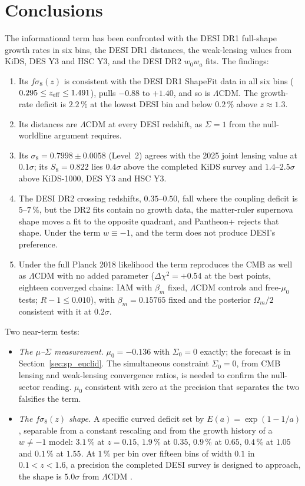 \section{Conclusions}
The informational term has been confronted with the DESI DR1 full-shape growth rates in six bins, the DESI DR1 distances, the weak-lensing values
from KiDS, DES Y3 and HSC Y3, and the DESI DR2 $w_0w_a$ fits. The findings:
\begin{enumerate}
\item Its $f\sigma_8(z)$ is consistent with the DESI DR1 ShapeFit data in all six bins ($0.295\le z_{\rm eff}\le1.491$), pulls $-0.88$ to $+1.40$, and so
is $\Lambda$CDM. The growth-rate deficit is $2.2\,\%$ at the lowest DESI bin and below $0.2\,\%$ above $z\approx1.3$. \calc
\item Its distances are $\Lambda$CDM at every DESI redshift, as $\Sigma=1$ from the null-worldline argument requires. \prediction
\item Its $\sigma_8=0.7998\pm0.0058$ (Level~2) agrees with the 2025 joint lensing value at $0.1\sigma$; its $S_8=0.822$ lies $0.4\sigma$ above the
completed KiDS survey and $1.4$--$2.5\sigma$ above KiDS-1000, DES Y3 and HSC Y3. \calc
\item The DESI DR2 crossing redshifts, $0.35$--$0.50$, fall where the coupling deficit is $5$--$7\,\%$, but the DR2 fits contain no growth data, the
matter-ruler supernova shape moves a fit to the opposite quadrant, and Pantheon+ rejects that shape. Under the term $w\equiv-1$, and the term does not
produce DESI's preference. \calc
\item Under the full Planck 2018 likelihood the term reproduces the CMB as well as $\Lambda$CDM with no added parameter ($\Delta\chi^2=+0.54$ at the best points,
eighteen converged chains: IAM with $\beta_m$ fixed, $\Lambda$CDM controls and free-$\mu_0$ tests; $R-1\le0.010$), with $\beta_m=0.15765$ fixed and the posterior $\Omega_m/2$ consistent with it at $0.2\sigma$. \measured
\end{enumerate}
Two near-term tests:
\begin{itemize}
\item \emph{The $\mu$--$\Sigma$ measurement.} $\mu_0=-0.136$ with $\Sigma_0=0$ exactly; the forecast is in Section~\ref{sec:sp_euclid}. The
simultaneous constraint $\Sigma_0=0$, from CMB lensing and weak-lensing convergence ratios, is needed to confirm the null-sector reading. $\mu_0$
consistent with zero at the precision that separates the two falsifies the term. \prediction
\item \emph{The $f\sigma_8(z)$ shape.} A specific curved deficit set by $E(a)=\exp(1-1/a)$, separable from a constant rescaling and from the growth
history of a $w\neq-1$ model: $3.1\,\%$ at $z=0.15$, $1.9\,\%$ at $0.35$, $0.9\,\%$ at $0.65$, $0.4\,\%$ at $1.05$ and $0.1\,\%$ at $1.55$. At $1\,\%$
per bin over fifteen bins of width $0.1$ in $0.1<z<1.6$, a precision the completed DESI survey is designed to approach, the shape is $5.0\sigma$ from
$\Lambda$CDM \calc. \prediction
\end{itemize}

